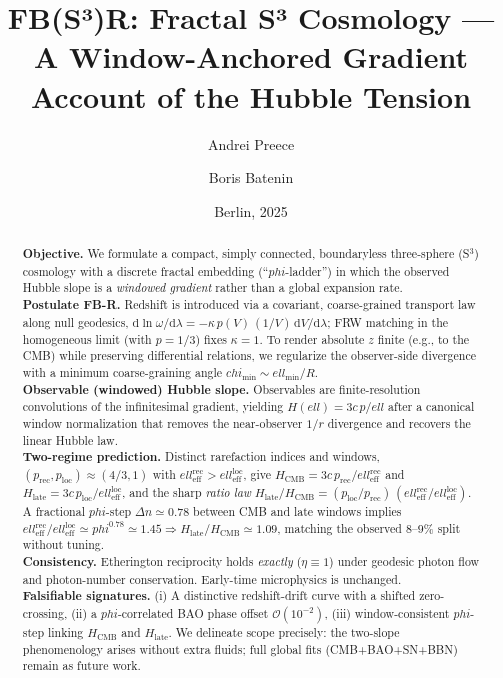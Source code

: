 \documentclass[
  onecolumn,
  amsmath,amssymb,
  aps,
  prd,
  superscriptaddress,
  nofootinbib,
  longbibliography
]{revtex4-2}
\newcommand{\vp}{\varphi}
\newcommand{\ellRec}{\ell_{\mathrm{eff}}^{\mathrm{rec}}}
\newcommand{\ellLoc}{\ell_{\mathrm{eff}}^{\mathrm{loc}}}
\newcommand{\pRec}{p_{\mathrm{rec}}}
\newcommand{\pLoc}{p_{\mathrm{loc}}}
\newcommand{\Hlate}{H_{\mathrm{late}}}
\newcommand{\HCMB}{H_{\mathrm{CMB}}}
\def\varphi{phi}%
\def\chi{chi}%
\def\ell{ell}%
\begin{document}
\title{FB(S³)R: Fractal S³ Cosmology — A Window-Anchored Gradient Account of the Hubble Tension}

\author{Andrei Preece}
\author{Boris Batenin}

\date{Berlin, 2025}

\begin{abstract}
\noindent
\textbf{Objective.} We formulate a compact, simply connected, boundaryless three-sphere (S$^3$) cosmology with a discrete fractal embedding (``$\vp$-ladder'') in which the observed Hubble slope is a \emph{windowed gradient} rather than a global expansion rate.\\
\textbf{Postulate FB-R.} Redshift is introduced via a covariant, coarse-grained transport law along null geodesics, $\mathrm{d}\ln\omega/\mathrm{d}\lambda=-\kappa\,p(V)\,(1/V)\,\mathrm{d}V/\mathrm{d}\lambda$; FRW matching in the homogeneous limit (with $p=1/3$) fixes $\kappa=1$. To render absolute $z$ finite (e.g., to the CMB) while preserving differential relations, we regularize the observer-side divergence with a minimum coarse-graining angle $\chi_{\min}\sim \ell_{\min}/R$.\\
\textbf{Observable (windowed) Hubble slope.} Observables are finite-resolution convolutions of the infinitesimal gradient, yielding $H(\ell)=3c\,p/\ell$ after a canonical window normalization that removes the near-observer $1/r$ divergence and recovers the linear Hubble law.\\
\textbf{Two-regime prediction.} Distinct rarefaction indices and windows, $(\pRec,\pLoc)\approx(4/3,1)$ with $\ellRec>\ellLoc$, give
$\HCMB=3c\,\pRec/\ellRec$ and $\Hlate=3c\,\pLoc/\ellLoc$, and the sharp \emph{ratio law}
$\Hlate/\HCMB=(\pLoc/\pRec)\,(\ellRec/\ellLoc)$. A fractional $\vp$-step $\Delta n\simeq 0.78$ between CMB and late windows implies $\ellRec/\ellLoc\simeq\vp^{0.78}\simeq 1.45 \Rightarrow \Hlate/\HCMB\simeq 1.09$, matching the observed $8$--$9\%$ split without tuning.\\
\textbf{Consistency.} Etherington reciprocity holds \emph{exactly} ($\eta\equiv1$) under geodesic photon flow and photon-number conservation. Early-time microphysics is unchanged.\\
\textbf{Falsifiable signatures.} (i) A distinctive redshift-drift curve with a shifted zero-crossing, (ii) a $\vp$-correlated BAO phase offset $\mathcal{O}(10^{-2})$, (iii) window-consistent $\vp$-step linking $\HCMB$ and $\Hlate$. We delineate scope precisely: the two-slope phenomenology arises without extra fluids; full global fits (CMB+BAO+SN+BBN) remain as future work.
\end{abstract}
\end{document}
